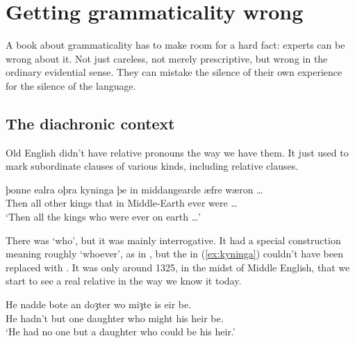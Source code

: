 \chapter{Getting grammaticality wrong}\label{ch:getting-grammaticality-wrong}

A book about grammaticality has to make room for a hard fact: experts can be wrong about it. Not just careless, not merely prescriptive, but wrong in the ordinary evidential sense. They can mistake the silence of their own experience for the silence of the language.

\section{The diachronic context}


Old English didn't have relative pronouns the way we have them. It just used  to mark subordinate clauses of various kinds, including relative clauses.

\ea \label{ex:kyninga}
    \gll þonne ealra oþra kyninga þe in middangearde æfre wæron \dots\\
        Then all other kings that in Middle-Earth ever were \dots\\
    \glt `Then all the kings who were ever on earth \dots'
\z

There was  `who', but it was mainly interrogative. It had a special construction meaning roughly `whoever', as in , but the  in (\ref{ex:kyninga}) couldn't have been replaced with . It was only around 1325, in the midst of Middle English, that we start to see a real relative  in the way we know it today.

\ea \label{ex:doȝter-wo}
    \gll He nadde bote an doȝter wo miȝte is eir be.\\
        He hadn't but one daughter who might his heir be.\\
    \glt `He had no one but a daughter who could be his heir.'
\z

